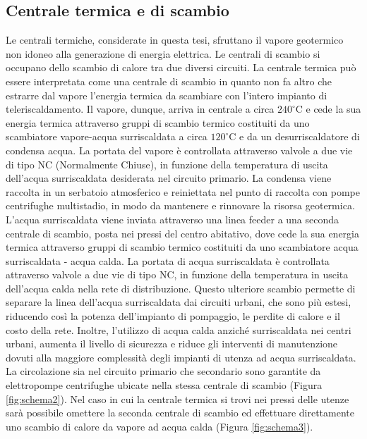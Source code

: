 \documentclass[laurea,oneside,11pt]{USiena_tesiLM3}
\begin{document}
\subsection{Centrale termica e di scambio}
Le centrali termiche, considerate in questa tesi, sfruttano il vapore geotermico non idoneo alla generazione di energia elettrica. Le centrali di scambio si occupano dello scambio di calore tra due diversi circuiti. La centrale termica può essere interpretata come una centrale di scambio in quanto non fa altro che estrarre dal vapore l'energia termica da scambiare con l'intero impianto di teleriscaldamento. Il vapore, dunque, arriva in centrale a circa $240 ^{\circ}$C e cede la sua energia termica attraverso gruppi di scambio termico costituiti da uno scambiatore vapore-acqua surriscaldata a circa $120 ^{\circ}$C e da un desurriscaldatore di condensa acqua. La portata del vapore è controllata attraverso  valvole a due vie di tipo NC (Normalmente Chiuse), in funzione della temperatura  di uscita dell'acqua surriscaldata desiderata nel circuito primario. La condensa viene raccolta in un serbatoio atmosferico e reiniettata nel punto di raccolta con pompe centrifughe multistadio, in modo da mantenere e rinnovare la risorsa geotermica. L'acqua surriscaldata viene inviata attraverso una linea feeder a una seconda centrale di scambio, posta nei pressi del centro abitativo, dove cede la sua energia termica attraverso gruppi di scambio termico costituiti da uno scambiatore acqua surriscaldata - acqua calda. La portata di acqua surriscaldata è controllata attraverso valvole a due vie di tipo NC, in funzione della temperatura in uscita dell'acqua calda nella rete di distribuzione. Questo ulteriore scambio permette di separare la linea dell'acqua surriscaldata  dai circuiti urbani, che sono più estesi, riducendo così la potenza dell'impianto di pompaggio, le perdite di calore e il costo della rete. Inoltre, l'utilizzo di acqua calda anziché surriscaldata nei centri urbani, aumenta il livello di sicurezza e riduce gli interventi di manutenzione dovuti alla maggiore complessità degli impianti di utenza ad acqua surriscaldata. La circolazione sia nel circuito primario che secondario sono garantite da elettropompe centrifughe ubicate nella stessa centrale di scambio (Figura \ref{fig:schema2}).
Nel caso in cui la centrale termica si trovi nei pressi delle utenze sarà possibile omettere la seconda centrale di scambio ed effettuare direttamente uno scambio di calore da vapore ad acqua calda (Figura \ref{fig:schema3}).
\end{document}
